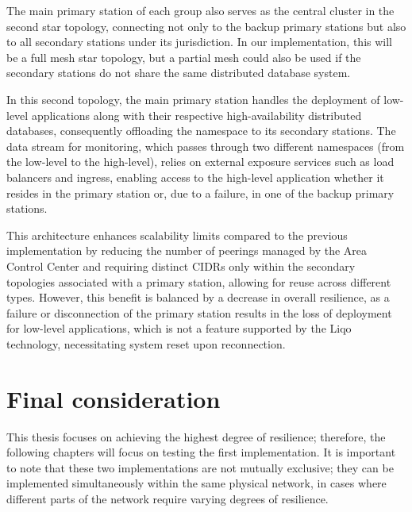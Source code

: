 The main primary station of each group also serves as the central cluster in the second star topology, connecting not only to the backup primary stations but also to all secondary stations under its jurisdiction. In our implementation, this will be a full mesh star topology, but a partial mesh could also be used if the secondary stations do not share the same distributed database system.

In this second topology, the main primary station handles the deployment of low-level applications along with their respective high-availability distributed databases, consequently offloading the namespace to its secondary stations. The data stream for monitoring, which passes through two different namespaces (from the low-level to the high-level), relies on external exposure services such as load balancers and ingress, enabling access to the high-level application whether it resides in the primary station or, due to a failure, in one of the backup primary stations.

This architecture enhances scalability limits compared to the previous implementation by reducing the number of peerings managed by the Area Control Center and requiring distinct CIDRs only within the secondary topologies associated with a primary station, allowing for reuse across different types. However, this benefit is balanced by a decrease in overall resilience, as a failure or disconnection of the primary station results in the loss of deployment for low-level applications, which is not a feature supported by the Liqo technology, necessitating system reset upon reconnection.

\section{Final consideration}
This thesis focuses on achieving the highest degree of resilience; therefore, the following chapters will focus on testing the first implementation. It is important to note that these two implementations are not mutually exclusive; they can be implemented simultaneously within the same physical network, in cases where different parts of the network require varying degrees of resilience.